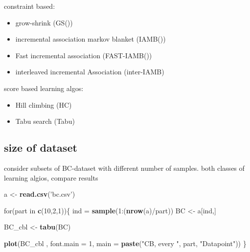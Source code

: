 \documentclass[]{article}
\newenvironment{Shaded}{\begin{snugshade}}{\end{snugshade}}
\newcommand{\KeywordTok}[1]{\textcolor[rgb]{0.13,0.29,0.53}{\textbf{{#1}}}}
\newcommand{\DataTypeTok}[1]{\textcolor[rgb]{0.13,0.29,0.53}{{#1}}}
\newcommand{\DecValTok}[1]{\textcolor[rgb]{0.00,0.00,0.81}{{#1}}}
\newcommand{\StringTok}[1]{\textcolor[rgb]{0.31,0.60,0.02}{{#1}}}
\newcommand{\NormalTok}[1]{{#1}}
\begin{document}
\clearpage

constraint based:

\begin{itemize}
\item grow-shrink (GS())
\item incremental association markov blanket (IAMB())
\item Fast incremental association (FAST-IAMB())
\item interleaved incremental Association (inter-IAMB)
\end{itemize}

score based learning algos:

\begin{itemize}
\item Hill climbing (HC)
\item Tabu search (Tabu)
\end{itemize}

\newpage

\subsection{size of dataset}\label{size-of-dataset}

consider subsets of BC-dataset with different number of samples. both
classes of learning algios, compare results

\begin{Shaded}
\begin{Highlighting}[]
\NormalTok{a <-}\StringTok{ }\KeywordTok{read.csv}\NormalTok{(}\StringTok{'bc.csv'}\NormalTok{)}

\NormalTok{for(part in }\KeywordTok{c}\NormalTok{(}\DecValTok{10}\NormalTok{,}\DecValTok{2}\NormalTok{,}\DecValTok{1}\NormalTok{))\{}
    \NormalTok{ind =}\StringTok{ }\KeywordTok{sample}\NormalTok{(}\DecValTok{1}\NormalTok{:(}\KeywordTok{nrow}\NormalTok{(a)/part))}
    \NormalTok{BC <-}\StringTok{ }\NormalTok{a[ind,]}
    
    \NormalTok{BC_cbl <-}\StringTok{ }\KeywordTok{tabu}\NormalTok{(BC)}
    
    \KeywordTok{plot}\NormalTok{(BC_cbl , }\DataTypeTok{font.main =} \DecValTok{1}\NormalTok{, }\DataTypeTok{main =} \KeywordTok{paste}\NormalTok{(}\StringTok{"CB, every "}\NormalTok{, part, }\StringTok{"Datapoint"}\NormalTok{))}
\NormalTok{\}}
\end{Highlighting}
\end{Shaded}
\end{document}
